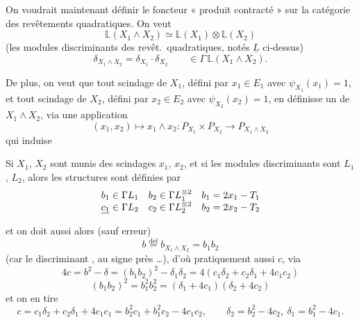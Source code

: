 \documentclass[11pt,a4paper]{article}
\begin{document}

On voudrait maintenant définir le foncteur « produit contracté » sur la catégorie des revêtements quadratiques. On veut
\[
  \mathbb{L}(X_1 \wedge X_2) \simeq \mathbb{L}(X_1) \otimes \mathbb{L}(X_2)
\]
(les modules discriminants des revêt.\ quadratiques, notés $\underline{L}$ ci-dessus)
\[
  \delta_{X_1 \wedge X_2} = \delta_{X_1} \cdot \delta_{X_2}
  \qquad \in \Gamma\,\mathbb{L}(X_1 \wedge X_2).
\]

De plus, on veut que tout scindage de $X_1$, défini par $x_1 \in E_1$ avec $\psi_{X_1}(x_1) = 1$, et tout scindage de $X_2$, défini par $x_2 \in E_2$ avec $\psi_{X_2}(x_2) = 1$, en définisse un de $X_1 \wedge X_2$, via une application
\[
  (x_1, x_2) \longmapsto x_1 \wedge x_2 : P_{X_1} \times P_{X_2} \to P_{X_1 \wedge X_2}
\]
qui induise


Si $X_1$, $X_2$ sont munis des scindages $x_1$, $x_2$, et si les modules discriminants sont $L_1$, $L_2$, alors les structures sont définies par
\[
  \begin{array}{lll}
  b_1 \in \Gamma L_1 & b_2 \in \Gamma L_1^{\otimes 2} & b_1 = 2x_1 - T_1 \\
  \uncertain{c_1} \in \Gamma L_2 & c_2 \in \Gamma L_2^{\otimes 2} & b_2 = 2x_2 - T_2
  \end{array}
\]

et on doit aussi alors (sauf erreur)
\[
  \boxed{b \overset{\mathrm{def}}{=} b_{X_1 \wedge X_2} = b_1 b_2}
\]
(car le discriminant , au signe près …), d'où pratiquement aussi $c$, via
\[
  4c = b^2 - \delta = (b_1 b_2)^2 - \delta_1 \delta_2 = 4(c_1\delta_2 + c_2\delta_1 + 4c_1c_2)
\]
\[
  (b_1b_2)^2 = b_1^2 b_2^2 = (\delta_1 + 4c_1)(\delta_2 + 4c_2)
\]
et on en tire
\[
  \boxed{c = c_1\delta_2 + c_2\delta_1 + 4c_1c_1}
  = b_2^2 c_1 + b_1^2 c_2 - 4c_1c_2,
  \qquad \delta_2 = b_2^2 - 4c_2,\ \delta_1 = b_1^2 - 4c_1.
\]
\end{document}
